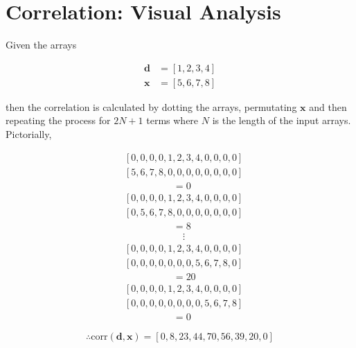 \documentclass{article}
\begin{document}
\section{Correlation: Visual Analysis}

Given the arrays

\begin{align}
    \mathbf{d} &= [1, 2, 3, 4] \nonumber \\
    \mathbf{x} &= [5, 6, 7, 8] 
\end{align}

then the correlation is calculated by dotting the arrays, permutating $\mathbf{x}$
and then repeating the process for $2N+1$ terms where $N$ is the length of
the input arrays. Pictorially,

\begin{align}
    &[0,0,0,0,1,2,3,4,0,0,0,0]\nonumber\\
    &[5,6,7,8,0,0,0,0,0,0,0,0]\nonumber\\
    &\hspace{5em}=0\nonumber\\[0.5cm]
    &[0,0,0,0,1,2,3,4,0,0,0,0]\nonumber\\
    &[0,5,6,7,8,0,0,0,0,0,0,0]\nonumber\\
    &\hspace{5em}=8\nonumber\\
    &\hspace{6em}\vdots\nonumber\\
    &[0,0,0,0,1,2,3,4,0,0,0,0]\nonumber\\
    &[0,0,0,0,0,0,0,5,6,7,8,0]\nonumber\\
    &\hspace{5em}=20\nonumber\\[0.5cm]
    &[0,0,0,0,1,2,3,4,0,0,0,0]\nonumber\\
    &[0,0,0,0,0,0,0,0,5,6,7,8]\nonumber\\
    &\hspace{5em}=0\nonumber
\end{align}

\begin{equation}
    \therefore \text{corr}(\mathbf{d}, \mathbf{x}) = [0,8,23,44,70,56,39,20,0]
\end{equation}
\end{document}
